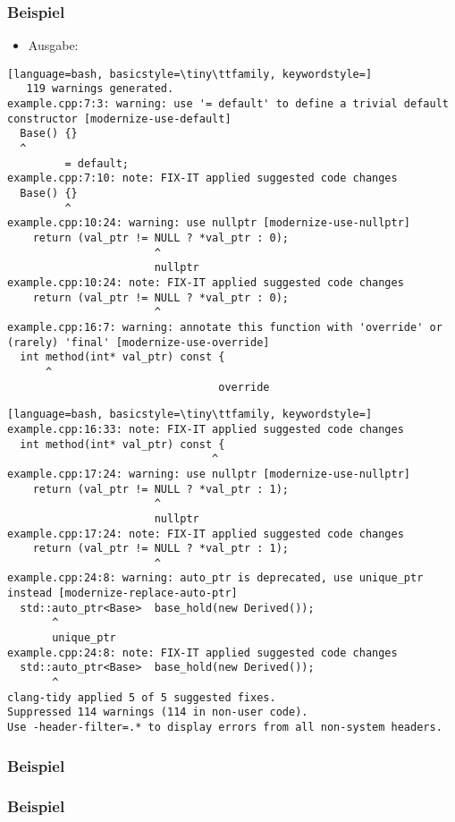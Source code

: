 \documentclass[aspectratio=169]{beamer}
\begin{document}
\begin{frame}[fragile]
  \frametitle{Beispiel}
  \begin{itemize}
  \item Ausgabe:
  \end{itemize}
  \begin{lstlisting}[language=bash, basicstyle=\tiny\ttfamily, keywordstyle=]
   119 warnings generated.
example.cpp:7:3: warning: use '= default' to define a trivial default constructor [modernize-use-default]
  Base() {}
  ^
         = default;
example.cpp:7:10: note: FIX-IT applied suggested code changes
  Base() {}
         ^
example.cpp:10:24: warning: use nullptr [modernize-use-nullptr]
    return (val_ptr != NULL ? *val_ptr : 0);
                       ^
                       nullptr
example.cpp:10:24: note: FIX-IT applied suggested code changes
    return (val_ptr != NULL ? *val_ptr : 0);
                       ^
example.cpp:16:7: warning: annotate this function with 'override' or (rarely) 'final' [modernize-use-override]
  int method(int* val_ptr) const {
      ^
                                 override
\end{lstlisting}
\end{frame}
\begin{frame}[fragile]
\begin{lstlisting}[language=bash, basicstyle=\tiny\ttfamily, keywordstyle=]
example.cpp:16:33: note: FIX-IT applied suggested code changes
  int method(int* val_ptr) const {
                                ^
example.cpp:17:24: warning: use nullptr [modernize-use-nullptr]
    return (val_ptr != NULL ? *val_ptr : 1);
                       ^
                       nullptr
example.cpp:17:24: note: FIX-IT applied suggested code changes
    return (val_ptr != NULL ? *val_ptr : 1);
                       ^
example.cpp:24:8: warning: auto_ptr is deprecated, use unique_ptr instead [modernize-replace-auto-ptr]
  std::auto_ptr<Base>  base_hold(new Derived());
       ^
       unique_ptr
example.cpp:24:8: note: FIX-IT applied suggested code changes
  std::auto_ptr<Base>  base_hold(new Derived());
       ^
clang-tidy applied 5 of 5 suggested fixes.
Suppressed 114 warnings (114 in non-user code).
Use -header-filter=.* to display errors from all non-system headers. 
\end{lstlisting}
\end{frame}
\begin{frame}[fragile]
  \frametitle{Beispiel}
  
\end{frame}
\begin{frame}[fragile]
  \frametitle{Beispiel}
  
\end{frame}
\end{document}
